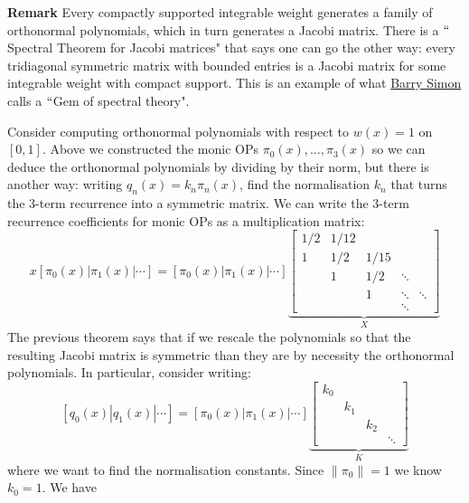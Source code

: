 \textbf{Remark} Every compactly supported integrable weight generates a family of orthonormal polynomials, which in turn generates a Jacobi matrix. There is a \ensuremath{\ldq}Spectral Theorem for Jacobi matrices" that says one can go the other way: every tridiagonal symmetric matrix with bounded entries is a Jacobi matrix for some integrable weight with compact support. This is an example of what \href{https://en.wikipedia.org/wiki/Barry_Simon}{Barry Simon} calls a \ensuremath{\ldq}Gem of spectral theory".

\begin{example} Consider computing orthonormal polynomials  with respect to $w(x) = 1$ on $[0,1]$. Above we constructed the monic OPs $\ensuremath{\pi}_0(x),\ensuremath{\ldots},\ensuremath{\pi}_3(x)$ so we can deduce the orthonormal polynomials by dividing by their norm, but there is another way: writing  $q_n(x) = k_n \ensuremath{\pi}_n(x)$, find the normalisation $k_n$ that turns the 3-term recurrence into a symmetric matrix.  We can write the 3-term recurrence coefficients for monic OPs as a multiplication matrix:
\[
x [\ensuremath{\pi}_0(x)| \ensuremath{\pi}_1(x)| \ensuremath{\cdots}] = [\ensuremath{\pi}_0(x)| \ensuremath{\pi}_1(x)| \ensuremath{\cdots}] \underbrace{\begin{bmatrix} 1/2 & 1/12 \\
                                                            1 & 1/2 & 1/15 \\
                                                            & 1 & 1/2 & \ensuremath{\ddots} \\
                                                            & & 1 & \ensuremath{\ddots} & \ensuremath{\ddots} \\
                                                            &&& \ensuremath{\ddots} \end{bmatrix}}_X
\]
The previous theorem says that if we rescale the polynomials so that the resulting Jacobi matrix is symmetric than they are by necessity the orthonormal polynomials. In particular, consider writing:
\[
[q_0(x) | q_1(x) | \ensuremath{\cdots}] = [\ensuremath{\pi}_0(x)| \ensuremath{\pi}_1(x)| \ensuremath{\cdots}] \underbrace{\begin{bmatrix}  k_0 \\ & k_1 \\ && k_2 \\ &&& \ensuremath{\ddots} \end{bmatrix}}_K
\]
where we want to find the normalisation constants. Since $\|\ensuremath{\pi}_0\| = 1$ we know $k_0 = 1$. We have

\end{example}
